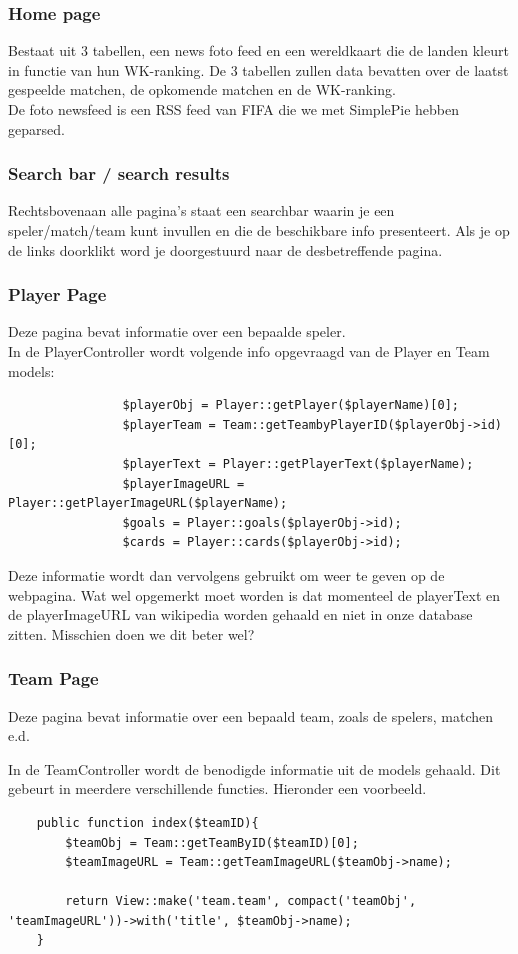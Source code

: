 \documentclass[11pt, a4paper]{article}
\begin{document}
\subsubsection{Home page}
Bestaat uit 3 tabellen, een news foto feed en een wereldkaart die de landen kleurt in functie van hun WK-ranking.
De 3 tabellen zullen data bevatten over de laatst gespeelde matchen, de opkomende matchen en de WK-ranking.
\\
De foto newsfeed is een RSS feed van FIFA die we met SimplePie hebben geparsed.
 
\subsubsection{Search bar / search results}
Rechtsbovenaan alle pagina's staat een searchbar waarin je een speler/match/team kunt invullen en die de beschikbare info presenteert. Als je op de links doorklikt word je doorgestuurd naar de desbetreffende pagina.
 
\subsubsection{Player Page}
Deze pagina bevat informatie over een bepaalde speler.
\\
In de PlayerController wordt volgende info opgevraagd van de Player en Team models:
\begin{lstlisting}
                $playerObj = Player::getPlayer($playerName)[0];
                $playerTeam = Team::getTeambyPlayerID($playerObj->id)[0];              
                $playerText = Player::getPlayerText($playerName);
                $playerImageURL = Player::getPlayerImageURL($playerName);
                $goals = Player::goals($playerObj->id);
                $cards = Player::cards($playerObj->id);
\end{lstlisting}
 
Deze informatie wordt dan vervolgens gebruikt om weer te geven op de webpagina. Wat wel opgemerkt moet worden is dat momenteel de playerText en de playerImageURL van wikipedia worden gehaald en niet
in onze database zitten. Misschien doen we dit beter wel?
\subsubsection{Team Page}
Deze pagina bevat informatie over een bepaald team, zoals de spelers, matchen e.d.
 
In de TeamController wordt de benodigde informatie uit de models gehaald. Dit gebeurt in meerdere verschillende functies. Hieronder een voorbeeld.
\begin{lstlisting}
	public function index($teamID){
		$teamObj = Team::getTeamByID($teamID)[0];
		$teamImageURL = Team::getTeamImageURL($teamObj->name);
		
		return View::make('team.team', compact('teamObj', 'teamImageURL'))->with('title', $teamObj->name);
	}
\end{lstlisting}
 
\end{document}
